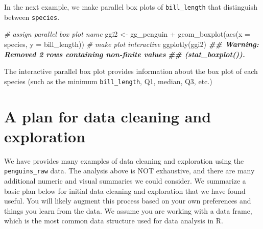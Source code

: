 \documentclass[
]{book}
\newenvironment{Shaded}{\begin{snugshade}}{\end{snugshade}}
\newcommand{\AttributeTok}[1]{\textcolor[rgb]{0.77,0.63,0.00}{#1}}
\newcommand{\CommentTok}[1]{\textcolor[rgb]{0.56,0.35,0.01}{\textit{#1}}}
\newcommand{\DocumentationTok}[1]{\textcolor[rgb]{0.56,0.35,0.01}{\textbf{\textit{#1}}}}
\newcommand{\FunctionTok}[1]{\textcolor[rgb]{0.00,0.00,0.00}{#1}}
\newcommand{\NormalTok}[1]{#1}
\newcommand{\OtherTok}[1]{\textcolor[rgb]{0.56,0.35,0.01}{#1}}
\newcommand{\SpecialCharTok}[1]{\textcolor[rgb]{0.00,0.00,0.00}{#1}}
\theoremstyle{definition}
\theoremstyle{definition}
\theoremstyle{definition}
\theoremstyle{definition}
\theoremstyle{remark}
\begin{document}
In the next example, we make parallel box plots of \texttt{bill\_length} that distinguish between \texttt{species}.

\begin{Shaded}
\begin{Highlighting}[]
\CommentTok{\# assign parallel box plot name}
\NormalTok{ggi2 }\OtherTok{\textless{}{-}}
\NormalTok{  gg\_penguin }\SpecialCharTok{+}
  \FunctionTok{geom\_boxplot}\NormalTok{(}\FunctionTok{aes}\NormalTok{(}\AttributeTok{x =}\NormalTok{ species, }\AttributeTok{y =}\NormalTok{ bill\_length))}
\CommentTok{\# make plot interactive}
\FunctionTok{ggplotly}\NormalTok{(ggi2)}
\DocumentationTok{\#\# Warning: Removed 2 rows containing non{-}finite values}
\DocumentationTok{\#\# (\textasciigrave{}stat\_boxplot()\textasciigrave{}).}
\end{Highlighting}
\end{Shaded}

The interactive parallel box plot provides information about the box plot of each species (such as the minimum \texttt{bill\_length}, Q1, median, Q3, etc.)

\hypertarget{a-plan-for-data-cleaning-and-exploration}{%
\section{A plan for data cleaning and exploration}\label{a-plan-for-data-cleaning-and-exploration}}

We have provides many examples of data cleaning and exploration using the \texttt{penguins\_raw} data. The analysis above is NOT exhaustive, and there are many additional numeric and visual summaries we could consider. We summarize a basic plan below for initial data cleaning and exploration that we have found useful. You will likely augment this process based on your own preferences and things you learn from the data. We assume you are working with a data frame, which is the most common data structure used for data analysis in R.
\end{document}
